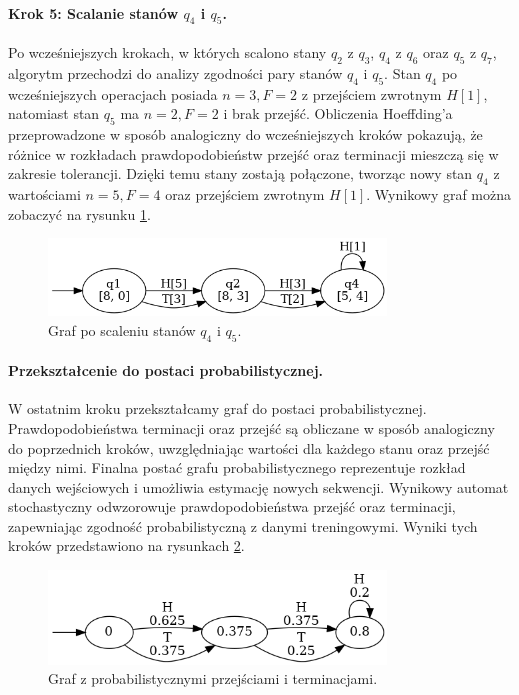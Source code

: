 \paragraph*{Krok 5: Scalanie stanów \( q_4 \) i \( q_5 \).}  
Po wcześniejszych krokach, w których scalono stany \( q_2 \) z \( q_3 \), \( q_4 \) z \( q_6 \) oraz \( q_5 \) z \( q_7 \), algorytm przechodzi do analizy zgodności pary stanów \( q_4 \) i \( q_5 \). Stan \( q_4 \) po wcześniejszych operacjach posiada \( n = 3, F = 2 \) z przejściem zwrotnym \( H[1] \), natomiast stan \( q_5 \) ma \( n = 2, F = 2 \) i brak przejść. Obliczenia Hoeffding’a przeprowadzone w sposób analogiczny do wcześniejszych kroków pokazują, że różnice w rozkładach prawdopodobieństw przejść oraz terminacji mieszczą się w zakresie tolerancji. Dzięki temu stany zostają połączone, tworząc nowy stan \( q_4 \) z wartościami \( n = 5, F = 4 \) oraz przejściem zwrotnym \( H[1] \). Wynikowy graf można zobaczyć na rysunku \ref{fig:alergia_example_3}.

\begin{figure}[ht]
    \centering
    \includegraphics[width=0.8\textwidth]{images/run_example/alergia/3.png}
    \caption{Graf po scaleniu stanów \( q_4 \) i \( q_5 \).}
    \label{fig:alergia_example_3}
\end{figure}  

\paragraph*{Przekształcenie do postaci probabilistycznej.}  
W ostatnim kroku przekształcamy graf do postaci probabilistycznej. Prawdopodobieństwa terminacji oraz przejść są obliczane w sposób analogiczny do poprzednich kroków, uwzględniając wartości dla każdego stanu oraz przejść między nimi. Finalna postać grafu probabilistycznego reprezentuje rozkład danych wejściowych i umożliwia estymację nowych sekwencji. Wynikowy automat stochastyczny odwzorowuje prawdopodobieństwa przejść oraz terminacji, zapewniając zgodność probabilistyczną z danymi treningowymi. Wyniki tych kroków przedstawiono na rysunkach \ref{fig:alergia_example_4}.  

\begin{figure}[ht]
    \centering
    \includegraphics[width=0.8\textwidth]{images/run_example/alergia/4.png}
    \caption{Graf z probabilistycznymi przejściami i terminacjami.}
    \label{fig:alergia_example_4}
\end{figure}  

